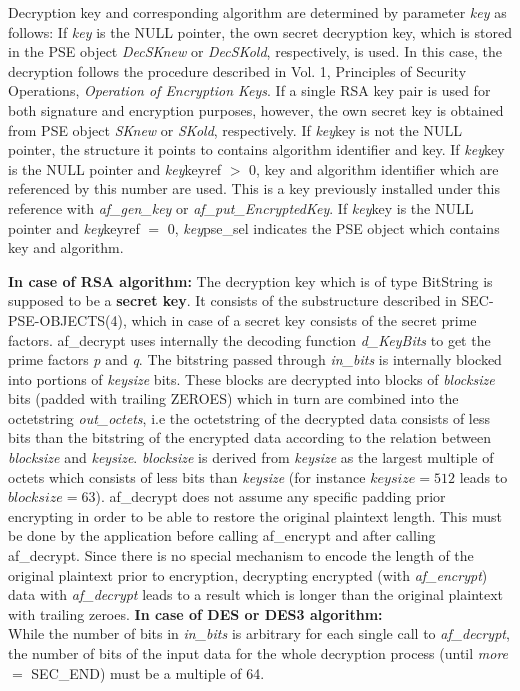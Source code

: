 Decryption key and corresponding algorithm are determined by parameter {\em key} as follows:
\be
\m If {\em key} is the NULL pointer,
   the own secret decryption key, which is stored in the PSE object
   {\em DecSKnew} or {\em DecSKold}, respectively, is used. 
   In this case, the decryption follows
   the procedure described in Vol. 1, Principles of Security Operations, {\em Operation of
   Encryption Keys}.
   If a single RSA key pair is used for both signature and encryption purposes, however, the own secret key is
   obtained from PSE object {\em SKnew} or {\em SKold}, respectively.
\m If {\em key}\pf key is not the NULL pointer, the structure it points to
   contains algorithm identifier and key.
\m If {\em key}\pf key is the NULL pointer and {\em key}\pf keyref $>$ 0,
   key and algorithm identifier which are referenced by this number are used. This is a key
   previously installed under this reference with {\em af\_gen\_key} or 
   {\em af\_put\_EncryptedKey}.
\m If {\em key}\pf key is the NULL pointer and {\em key}\pf keyref $=$ 0,
   {\em key}\pf pse\_sel indicates the PSE object which contains key and algorithm.
\ee

{\bf In case of RSA algorithm:}
\be
\m The decryption key which is of type BitString is supposed to be
   a {\bf secret key}. It consists of the substructure described in
   SEC-PSE-OBJECTS(4),
   which in case of a secret key consists of the secret
   prime factors. af\_decrypt uses internally the
   decoding function {\em d\_KeyBits} to get the prime factors {\em p} and {\em q}.
\m The bitstring passed through {\em in\_bits} is internally blocked into portions of
   {\em keysize} bits. These blocks are decrypted into blocks of {\em blocksize} bits
   (padded with trailing ZEROES) which in turn are combined into the octetstring {\em out\_octets}, i.e
   the octetstring of the decrypted data consists of less bits than the bitstring of the encrypted data
   according to the relation between {\em blocksize} and {\em keysize}.
   {\em blocksize} is derived from {\em keysize} as the largest multiple of octets which consists of
   less bits than {\em keysize} (for instance $keysize = 512$ leads to $blocksize = 63$).
\m af\_decrypt does not assume any specific padding prior encrypting in order to be able to
   restore the original plaintext length. This must be done by the application before 
   calling  af\_encrypt and after calling af\_decrypt.
\m Since there is no special mechanism to encode the length of the original plaintext prior
   to encryption, decrypting encrypted (with {\em af\_encrypt}) data with {\em af\_decrypt}
   leads to a result which is longer than the original plaintext with trailing zeroes.
\ee
{\bf In case of DES or DES3 algorithm:} \\ [1em]
   While the number of bits in {\em in\_bits} is arbitrary for each single call to
   {\em af\_decrypt}, the number of bits of the input data for the whole
   decryption process (until {\em more} $=$ SEC\_END) must be a multiple of 64.

